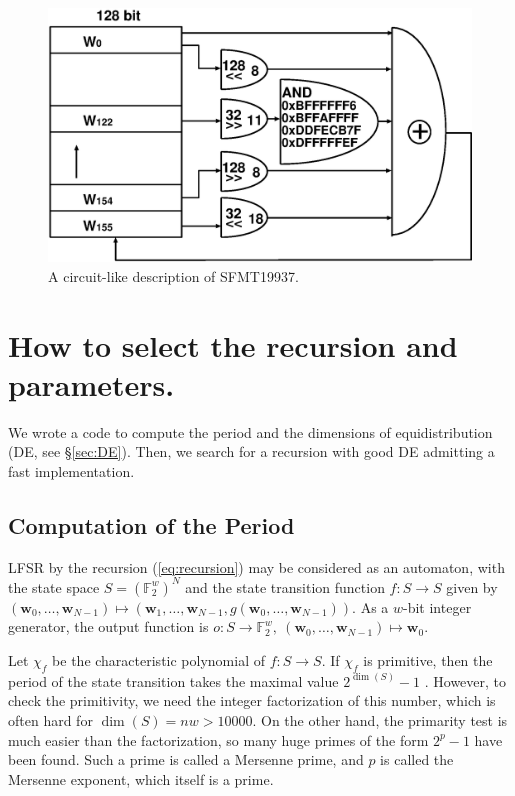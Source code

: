 \documentclass{svmult}
\def\F2{{\mathbb F}_2}
\def\bw{{{\mathbf w}}}
\begin{document}
\begin{figure}
\begin{center}
\includegraphics[width=0.7\linewidth]{sfmt-b2.eps}
\end{center}
\caption{A circuit-like description of SFMT19937.}
\label{fig:SFMT-B2}
\end{figure}

\section{How to select the recursion and parameters.}
We wrote a code to compute the period and
the dimensions of equidistribution (DE,
see \S\ref{sec:DE}). 
Then, we search
for a recursion with good DE admitting a fast implementation.  

\subsection{Computation of the Period}\label{sec:period}
LFSR by the recursion (\ref{eq:recursion})
may be considered as an automaton, 
with the state space $S=(\F2^{w})^{N}$
and the state transition function 
$f: S \to S$ given by
$(\bw_0,\ldots,\bw_{N-1})
\mapsto (\bw_1,\ldots,\bw_{N-1}, g(\bw_0,\ldots,\bw_{N-1}))$.  
As a $w$-bit integer generator, the output function is 
$o: S \to \F2^{w},\  (\bw_0,\ldots,\bw_{N-1}) \mapsto \bw_0$.

Let $\chi_f$ be the characteristic polynomial of $f:S \to S$.
If $\chi_f$ is primitive, then the 
period of the state transition takes the maximal value
$2^{\dim(S)}-1$ \cite[\S3.2.2]{knuth:bible}. 
However, to check the primitivity, we need
the integer factorization of this number, which is often
hard for $\dim(S)=nw>10000$. 
On the other hand, the primarity test is much easier than 
the factorization, so many huge primes of the form 
$2^p-1$ have been found. 
Such a prime is called a Mersenne prime, and $p$ is
called the Mersenne exponent, which itself is a prime.
\end{document}
